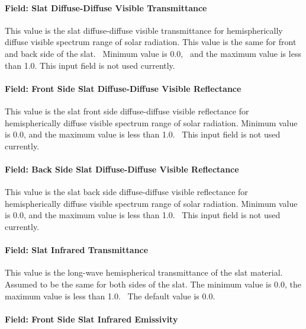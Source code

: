 \paragraph{Field: Slat Diffuse-Diffuse Visible Transmittance}\label{field-slat-diffuse-diffuse-visible-transmittance}

This value is the slat diffuse-diffuse visible transmittance for hemispherically diffuse visible spectrum range of solar radiation. This value is the same for front and back side of the slat.~ Minimum value is 0.0,~ and the maximum value is less than 1.0. This input field is not used currently.

\paragraph{Field: Front Side Slat Diffuse-Diffuse Visible Reflectance}\label{field-front-side-slat-diffuse-diffuse-visible-reflectance}

This value is the slat front side diffuse-diffuse visible reflectance for hemispherically diffuse visible spectrum range of solar radiation. Minimum value is 0.0, and the maximum value is less than 1.0.~ This input field is not used currently.

\paragraph{Field: Back Side Slat Diffuse-Diffuse Visible Reflectance}\label{field-back-side-slat-diffuse-diffuse-visible-reflectance}

This value is the slat back side diffuse-diffuse visible reflectance for hemispherically diffuse visible spectrum range of solar radiation. Minimum value is 0.0, and the maximum value is less than 1.0.~ This input field is not used currently.

\paragraph{Field: Slat Infrared Transmittance}\label{field-slat-Infrared-transmittance}

This value is the long-wave hemispherical transmittance of the slat material. Assumed to be the same for both sides of the slat. The minimum value is 0.0, the maximum value is less than 1.0.~ The default value is 0.0.

\paragraph{Field: Front Side Slat Infrared Emissivity}\label{field-front-side-slat-infrared-emissivity}

